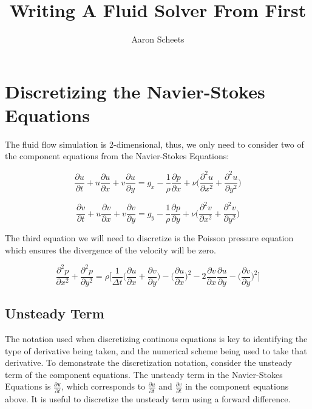 \documentclass[twocolumn,12pth]{article}
\title{Writing A Fluid Solver From First}
\author{Aaron Scheets}
\begin{document}
\maketitle

\section{Discretizing the Navier-Stokes Equations}

The fluid flow simulation is 2-dimensional, thus, we only need to consider two of the component equations from the Navier-Stokes Equations:

\begin{equation}
\frac{\partial{u}}{\partial{t}} + u\frac{\partial{u}}{\partial{x}} + v\frac{\partial{u}}{\partial{y}} = g_x - \frac{1}{\rho}\frac{\partial{p}}{\partial{x}} + \nu \bigg( \frac{\partial^2u}{\partial{x}^2} + \frac{\partial^2u}{\partial{y}^2} \bigg)
\label{eq:exs1}
\end{equation}

\begin{equation*}
\frac{\partial{v}}{\partial{t}} + u\frac{\partial{v}}{\partial{x}} + v\frac{\partial{v}}{\partial{y}} = g_y -\frac{1}{\rho}\frac{\partial{p}}{\partial{y}} + \nu \bigg( \frac{\partial^2v}{\partial{x}^2} + \frac{\partial^2v}{\partial{y}^2} \bigg)
\end{equation*}

The third equation we will need to discretize is the Poisson pressure equation which ensures the divergence of the velocity will be zero.

\begin{equation}
\frac{\partial^2p}{\partial{x}^2} + \frac{\partial^2p}{\partial{y}^2} = \rho \bigg[ \frac{1}{\Delta{t}}\bigg(\frac{\partial{u}}{\partial{x}} + \frac{\partial{v}}{\partial{y}} \bigg) - \bigg(\frac{\partial{u}}{\partial{x}} \bigg)^2 - 2\frac{\partial{v}}{\partial{x}}\frac{\partial{u}}{\partial{y}} - \bigg(\frac{\partial{v}}{\partial{y}}  \bigg)^2  \bigg]
\label{eq:exs2}
\end{equation}

\subsection{Unsteady Term}

The notation used when discretizing continous equations is key to identifying the type of derivative being taken, and the numerical scheme being used to take that derivative.
To demonstrate the discretization notation, consider the unsteady term of the component equations.
The unsteady term in the Navier-Stokes Equations is $\frac{\partial{\mathbf{v}}}{\partial{t}}$, which corresponds to $\frac{\partial{u}}{\partial{t}}$ and $\frac{\partial{v}}{\partial{t}}$ in the component equations above.
It is useful to discretize the unsteady term using a forward difference.
\end{document}

